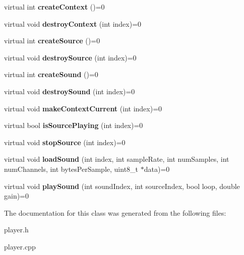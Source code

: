 \begin{DoxyCompactItemize}
\item 
\hypertarget{classg2c_1_1_player_aa7a100a15b6cf684707516a644086c23}{
virtual int {\bfseries createContext} ()=0}
\label{classg2c_1_1_player_aa7a100a15b6cf684707516a644086c23}

\item 
\hypertarget{classg2c_1_1_player_abe5399d1e309a9f54776f3a931b08fb3}{
virtual void {\bfseries destroyContext} (int index)=0}
\label{classg2c_1_1_player_abe5399d1e309a9f54776f3a931b08fb3}

\item 
\hypertarget{classg2c_1_1_player_aa36458a27d9b8129ab1b9e01cdcf985b}{
virtual int {\bfseries createSource} ()=0}
\label{classg2c_1_1_player_aa36458a27d9b8129ab1b9e01cdcf985b}

\item 
\hypertarget{classg2c_1_1_player_ab45f2395c2ad343dc5315d4734018fde}{
virtual void {\bfseries destroySource} (int index)=0}
\label{classg2c_1_1_player_ab45f2395c2ad343dc5315d4734018fde}

\item 
\hypertarget{classg2c_1_1_player_a92af47935538ed4a64f35dd926f6625e}{
virtual int {\bfseries createSound} ()=0}
\label{classg2c_1_1_player_a92af47935538ed4a64f35dd926f6625e}

\item 
\hypertarget{classg2c_1_1_player_a6743fdc2e61ea1dd5aff7cec08c59828}{
virtual void {\bfseries destroySound} (int index)=0}
\label{classg2c_1_1_player_a6743fdc2e61ea1dd5aff7cec08c59828}

\item 
\hypertarget{classg2c_1_1_player_ad936c96127a0592741ba1f7afd8e89fa}{
virtual void {\bfseries makeContextCurrent} (int index)=0}
\label{classg2c_1_1_player_ad936c96127a0592741ba1f7afd8e89fa}

\item 
\hypertarget{classg2c_1_1_player_a66492c203fce691cd7a671ee24188f05}{
virtual bool {\bfseries isSourcePlaying} (int index)=0}
\label{classg2c_1_1_player_a66492c203fce691cd7a671ee24188f05}

\item 
\hypertarget{classg2c_1_1_player_a77f9bbc3b34d7c2389fd6dcff3b479ef}{
virtual void {\bfseries stopSource} (int index)=0}
\label{classg2c_1_1_player_a77f9bbc3b34d7c2389fd6dcff3b479ef}

\item 
\hypertarget{classg2c_1_1_player_aabb1086f5b4825b751f9269e0f94bc80}{
virtual void {\bfseries loadSound} (int index, int sampleRate, int numSamples, int numChannels, int bytesPerSample, uint8\_\-t $\ast$data)=0}
\label{classg2c_1_1_player_aabb1086f5b4825b751f9269e0f94bc80}

\item 
\hypertarget{classg2c_1_1_player_a057cc6517be7a061b5bb47452410c9c4}{
virtual void {\bfseries playSound} (int soundIndex, int sourceIndex, bool loop, double gain)=0}
\label{classg2c_1_1_player_a057cc6517be7a061b5bb47452410c9c4}

\end{DoxyCompactItemize}


The documentation for this class was generated from the following files:\begin{DoxyCompactItemize}
\item 
player.h\item 
player.cpp\end{DoxyCompactItemize}
